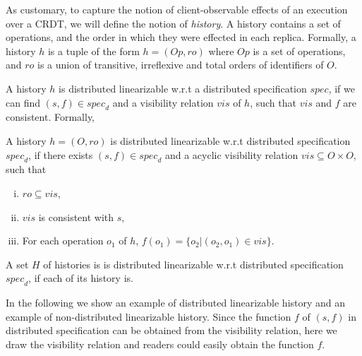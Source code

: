  As customary, to capture the notion of client-observable effects of an execution over a CRDT, we will define the notion of \emph{history}. A history contains a set of operations, and the order in which they were effected in each replica. Formally, a history $h$ is a tuple of the form $h = (Op,\mathit{ro})$ where $Op$ is a set of operations, and $\mathit{ro}$ is a union of transitive, irreflexive and total orders of identifiers of $O$. 


A history $h$ is distributed linearizable w.r.t a distributed specification $\mathit{spec}$, if we can find $(s,f) \in \mathit{spec}_d$ and a visibility relation $\mathit{vis}$ of $h$, such that $\mathit{vis}$ and $f$ are consistent. Formally, 

\begin{definition}
\label{definition:distributed linearizability}
A history $h = (O,\mathit{ro})$ is distributed linearizable w.r.t distributed specification $\mathit{spec}_d$, if there exists $(s,f) \in \mathit{spec}_d$ and a acyclic visibility relation $\mathit{vis} \subseteq O \times O$, such that 

\begin{enumerate}[(i)]
\item $\mathit{ro} \subseteq \mathit{vis}$,
\item $\mathit{vis}$ is consistent with $s$, 
\item For each operation $o_1$ of $h$, $f(o_1) = \{ o_2 \vert (o_2,o_1) \in \mathit{vis} \}$. 
\end{enumerate}

A set $H$ of histories is is distributed linearizable w.r.t distributed specification $\mathit{spec}_d$, if each of its history is.
\end{definition}



In the following we show an example of distributed linearizable history and an example of non-distributed linearizable history. Since the function $f$ of $(s,f)$ in distributed specification can be obtained from the visibility relation, here we draw the visibility relation and readers could easily obtain the function $f$. 

